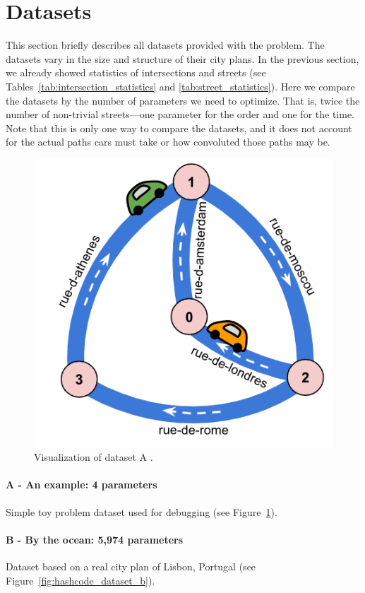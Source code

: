 \section{Datasets} \label{sec:datasets}

This section briefly describes all datasets provided with the problem.
The datasets vary in the size and structure of their city plans.
In the previous section, we already showed statistics of intersections and streets (see Tables~\ref{tab:intersection_statistics} and \ref{tab:street_statistics}).
Here we compare the datasets by the number of parameters we need to optimize.
That is, twice the number of non-trivial streets---one parameter for the order and one for the time. Note that this is only one way to compare the datasets, and it does not account for the actual paths cars must take or how convoluted those paths may be.

\begin{figure}[h]
    \centering
    \includegraphics[width=.5\linewidth]{img/hashcode/figure5.png}
    \caption[Visualization of dataset A]{
        Visualization of dataset A \cite{google2023google}.
    }
    \label{fig:hashcode_dataset_a}
\end{figure}

\paragraph{A - An example: 4 parameters} Simple toy problem dataset used for debugging (see Figure~\ref{fig:hashcode_dataset_a}).

\paragraph{B - By the ocean: 5,974 parameters} Dataset based on a real city plan of Lisbon, Portugal (see Figure~\ref{fig:hashcode_dataset_b}).

